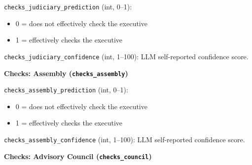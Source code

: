 \documentclass[11pt, a4paper]{article}
\newenvironment{promptquote}{%
  \begin{quote}\small
}{%
  \end{quote}
}
\begin{document}
\texttt{checks\_judiciary\_prediction} (int, 0--1):
\begin{itemize}[nosep, leftmargin=1.7em]
  \item 0 = does not effectively check the executive
  \item 1 = effectively checks the executive
\end{itemize}
\texttt{checks\_judiciary\_confidence} (int, 1--100): LLM self-reported confidence score.

\bigskip
\textbf{Checks: Assembly (\texttt{checks\_assembly})}




\texttt{checks\_assembly\_prediction} (int, 0--1):
\begin{itemize}[nosep, leftmargin=1.7em]
  \item 0 = does not effectively check the executive
  \item 1 = effectively checks the executive
\end{itemize}
\texttt{checks\_assembly\_confidence} (int, 1--100): LLM self-reported confidence score.

\bigskip
\textbf{Checks: Advisory Council (\texttt{checks\_council})}

\end{document}
